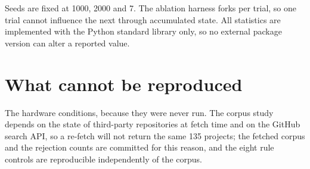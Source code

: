 Seeds are fixed at 1000, 2000 and 7. The ablation harness forks per trial, so one trial cannot
influence the next through accumulated state. All statistics are implemented with the Python
standard library only, so no external package version can alter a reported value.

\section{What cannot be reproduced}

The hardware conditions, because they were never run. The corpus study depends on the state of
third-party repositories at fetch time and on the GitHub search API, so a re-fetch will not
return the same 135 projects; the fetched corpus and the rejection counts are committed for this
reason, and the eight rule controls are reproducible independently of the corpus.
